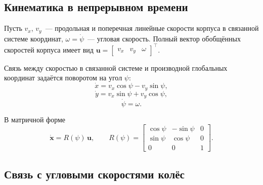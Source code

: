 
\subsection{Кинематика в непрерывном времени}

Пусть $v_x$, $v_y$~--- продольная и поперечная линейные скорости
корпуса в связанной системе координат, $\omega = \dot{\psi}$~--- угловая
скорость. Полный вектор обобщённых скоростей корпуса имеет вид
$\mathbf{u} = \begin{bmatrix} v_x & v_y & \omega \end{bmatrix}^{\top}$.

Связь между скоростью в связанной системе и производной глобальных
координат задаётся поворотом на угол $\psi$:
\begin{equation}
\dot{x} = v_x \cos\psi - v_y \sin\psi,
\label{eq:kin_x}
\end{equation}
\begin{equation}
\dot{y} = v_x \sin\psi + v_y \cos\psi,
\label{eq:kin_y}
\end{equation}
\begin{equation}
\dot{\psi} = \omega.
\label{eq:kin_psi}
\end{equation}

В матричной форме
\begin{equation}
\dot{\mathbf{x}} = R(\psi)\,\mathbf{u},\qquad
R(\psi) =
\begin{bmatrix}
\cos\psi & -\sin\psi & 0\\
\sin\psi & \cos\psi & 0\\
0 & 0 & 1
\end{bmatrix}.
\label{eq:kin_matrix}
\end{equation}

\subsection{Связь с угловыми скоростями колёс}

